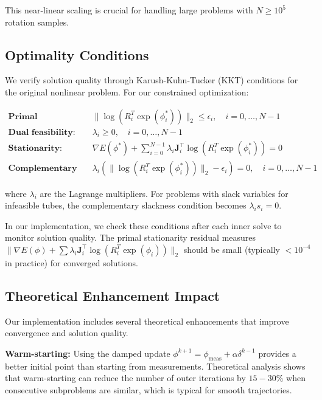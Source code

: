 This near-linear scaling is crucial for handling large problems with $N \geq 10^5$ rotation samples.

\subsection{Optimality Conditions}

We verify solution quality through Karush-Kuhn-Tucker (KKT) conditions for the original nonlinear problem. For our constrained optimization:

\begin{align}
\textbf{Primal feasibility:} & \quad \| \log(R_i^T \exp(\phi_i^*)) \|_2 \leq \epsilon_i, \quad i = 0,\ldots,N-1 \\
\textbf{Dual feasibility:} & \quad \lambda_i \geq 0, \quad i = 0,\ldots,N-1 \\
\textbf{Stationarity:} & \quad \nabla E(\phi^*) + \sum_{i=0}^{N-1} \lambda_i \mathbf{J}_i^{\top} \log(R_i^T \exp(\phi_i^*)) = 0 \\
\textbf{Complementary slackness:} & \quad \lambda_i (\| \log(R_i^T \exp(\phi_i^*)) \|_2 - \epsilon_i) = 0, \quad i = 0,\ldots,N-1
\end{align}

where $\lambda_i$ are the Lagrange multipliers. For problems with slack variables for infeasible tubes, the complementary slackness condition becomes $\lambda_i s_i = 0$.

In our implementation, we check these conditions after each inner solve to monitor solution quality. The primal stationarity residual measures $\|\nabla E(\phi) + \sum \lambda_i \mathbf{J}_i^{\top} \log(R_i^T \exp(\phi_i)) \|_2$ should be small (typically $< 10^{-4}$ in practice) for converged solutions.

\subsection{Theoretical Enhancement Impact}

Our implementation includes several theoretical enhancements that improve convergence and solution quality.

\textbf{Warm-starting:} Using the damped update $\phi^{k+1} = \phi_{\text{meas}} + \alpha \delta^{k-1}$ provides a better initial point than starting from measurements. Theoretical analysis shows that warm-starting can reduce the number of outer iterations by $15-30\%$ when consecutive subproblems are similar, which is typical for smooth trajectories.

